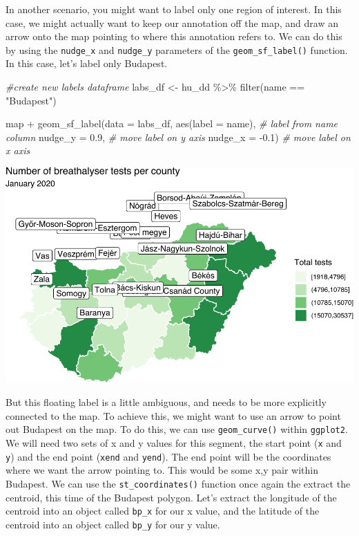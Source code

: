 \documentclass[
  krantz2]{krantz}
\makeatletter
\newenvironment{Shaded}{\begin{snugshade}}{\end{snugshade}}
\newcommand{\AttributeTok}[1]{\textcolor[rgb]{0.61,0.61,0.61}{#1}}
\newcommand{\CommentTok}[1]{\textcolor[rgb]{0.37,0.37,0.37}{\textit{#1}}}
\newcommand{\FloatTok}[1]{\textcolor[rgb]{0.06,0.06,0.06}{#1}}
\newcommand{\FunctionTok}[1]{\textcolor[rgb]{0,0,0}{#1}}
\newcommand{\NormalTok}[1]{#1}
\newcommand{\OtherTok}[1]{\textcolor[rgb]{0.37,0.37,0.37}{#1}}
\newcommand{\SpecialCharTok}[1]{\textcolor[rgb]{0,0,0}{#1}}
\newcommand{\StringTok}[1]{\textcolor[rgb]{0.5,0.5,0.5}{#1}}
\newenvironment{kframe}{%
\medskip{}
\setlength{\fboxsep}{.8em}
 \def\at@end@of@kframe{}%
 \ifinner\ifhmode%
  \def\at@end@of@kframe{\end{minipage}}%
  \begin{minipage}{\columnwidth}%
 \fi\fi%
 \def\FrameCommand##1{\hskip\@totalleftmargin \hskip-\fboxsep
 \colorbox{shadecolor}{##1}\hskip-\fboxsep
     \hskip-\linewidth \hskip-\@totalleftmargin \hskip\columnwidth}%
 \MakeFramed {\advance\hsize-\width
   \@totalleftmargin\z@ \linewidth\hsize
   \@setminipage}}%
 {\par\unskip\endMakeFramed%
 \at@end@of@kframe}
\renewenvironment{Shaded}{\begin{kframe}}{\end{kframe}}
\makeatother
\begin{document}
In another scenario, you might want to label only one region of interest. In this case, we might actually want to keep our annotation off the map, and draw an arrow onto the map pointing to where this annotation refers to. We can do this by using the \texttt{nudge\_x} and \texttt{nudge\_y} parameters of the \texttt{geom\_sf\_label()} function. In this case, let's label only Budapest.

\begin{Shaded}
\begin{Highlighting}[]
\CommentTok{\#create new labels dataframe}
\NormalTok{labs\_df }\OtherTok{\textless{}{-}}\NormalTok{ hu\_dd }\SpecialCharTok{\%\textgreater{}\%} \FunctionTok{filter}\NormalTok{(name }\SpecialCharTok{==} \StringTok{"Budapest"}\NormalTok{)}

\NormalTok{map }\SpecialCharTok{+} 
  \FunctionTok{geom\_sf\_label}\NormalTok{(}\AttributeTok{data =}\NormalTok{ labs\_df, }\FunctionTok{aes}\NormalTok{(}\AttributeTok{label =}\NormalTok{ name), }\CommentTok{\# label from name column}
                \AttributeTok{nudge\_y =} \FloatTok{0.9}\NormalTok{,  }\CommentTok{\# move label on y axis}
                \AttributeTok{nudge\_x =} \SpecialCharTok{{-}}\FloatTok{0.1}\NormalTok{)  }\CommentTok{\# move label on x axis}
\end{Highlighting}
\end{Shaded}

\includegraphics{crime_mapping_files/figure-latex/addcountynamesBPonly-1.pdf}

But this floating label is a little ambiguous, and needs to be more explicitly connected to the map. To achieve this, we might want to use an arrow to point out Budapest on the map. To do this, we can use \texttt{geom\_curve()} within \texttt{ggplot2}. We will need two sets of x and y values for this segment, the start point (\texttt{x} and \texttt{y}) and the end point (\texttt{xend} and \texttt{yend}). The end point will be the coordinates where we want the arrow pointing to. This would be some x,y pair within Budapest. We can use the \texttt{st\_coordinates()} function once again the extract the centroid, this time of the Budapest polygon. Let's extract the longitude of the centroid into an object called \texttt{bp\_x} for our x value, and the latitude of the centroid into an object called \texttt{bp\_y} for our y value.
\end{document}
